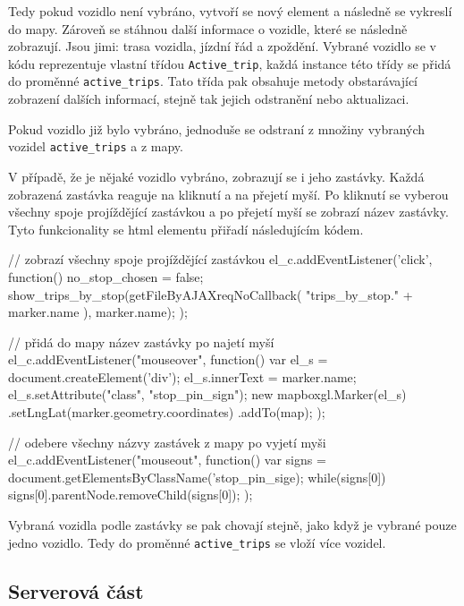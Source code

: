 \bigbreak


Tedy pokud vozidlo není vybráno, vytvoří se nový element a následně se vykreslí do mapy. Zároveň se stáhnou další informace o vozidle, které se následně zobrazují. Jsou jimi: trasa vozidla, jízdní řád a zpoždění. Vybrané vozidlo se v kódu reprezentuje vlastní třídou \verb-Active_trip-, každá instance této třídy se přidá do proměnné \verb-active_trips-. Tato třída pak obsahuje metody obstarávající zobrazení dalších informací, stejně tak jejich odstranění nebo aktualizaci.


\bigbreak


Pokud vozidlo již bylo vybráno, jednoduše se odstraní z množiny vybraných vozidel \verb-active_trips- a z mapy.


\bigbreak


V případě, že je nějaké vozidlo vybráno, zobrazují se i jeho zastávky. Každá zobrazená zastávka reaguje na kliknutí a na přejetí myší. Po kliknutí se vyberou všechny spoje projíždějící zastávkou a po přejetí myší se zobrazí název zastávky. Tyto funkcionality se \gls{html} elementu přiřadí následujícím kódem.


\begin{code}[frame=none]
// zobrazí všechny spoje projíždějící zastávkou
el_c.addEventListener('click', function() {
  no_stop_chosen = false;
  show_trips_by_stop(getFileByAJAXreqNoCallback(
    "trips_by_stop." + marker.name
  ), marker.name);
});


// přidá do mapy název zastávky po najetí myší
el_c.addEventListener("mouseover", function(){
  var el_s = document.createElement('div');
  el_s.innerText = marker.name;
  el_s.setAttribute("class", "stop_pin_sign");
  new mapboxgl.Marker(el_s)
    .setLngLat(marker.geometry.coordinates)
    .addTo(map);
});


// odebere všechny názvy zastávek z mapy po vyjetí myši
el_c.addEventListener("mouseout", function(){
  var signs = document.getElementsByClassName('stop_pin_sige);
  while(signs[0]) {
    signs[0].parentNode.removeChild(signs[0]);
  }
});
\end{code}


Vybraná vozidla podle zastávky se pak chovají stejně, jako když je vybrané pouze jedno vozidlo. Tedy do proměnné \verb-active_trips- se vloží více vozidel.


\subsection{Serverová část}

